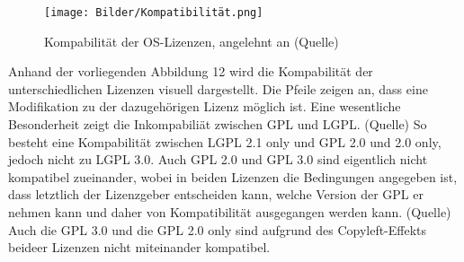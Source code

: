 \begin{figure}[h]
    \centering
    \texttt{[image: Bilder/Kompatibilität.png]}
    \caption{Kompabilität der OS-Lizenzen, angelehnt an (Quelle)}
\end{figure}

Anhand der vorliegenden Abbildung 12 wird die Kompabilität der unterschiedlichen Lizenzen visuell dargestellt. Die Pfeile zeigen an, dass eine Modifikation zu der dazugehörigen Lizenz möglich ist. Eine wesentliche Besonderheit zeigt die Inkompabiliät zwischen GPL und LGPL. (Quelle) So besteht eine Kompabilität zwischen LGPL 2.1 only und GPL 2.0 und 2.0 only, jedoch nicht zu LGPL 3.0. Auch GPL 2.0 und GPL 3.0 sind eigentlich nicht kompatibel zueinander, wobei in beiden Lizenzen die Bedingungen angegeben ist, dass letztlich der Lizenzgeber entscheiden kann, welche Version der GPL er nehmen kann und daher von Kompatibilität ausgegangen werden kann. (Quelle) Auch die GPL 3.0 und die GPL 2.0 only sind aufgrund des Copyleft-Effekts beideer Lizenzen nicht miteinander kompatibel. 














